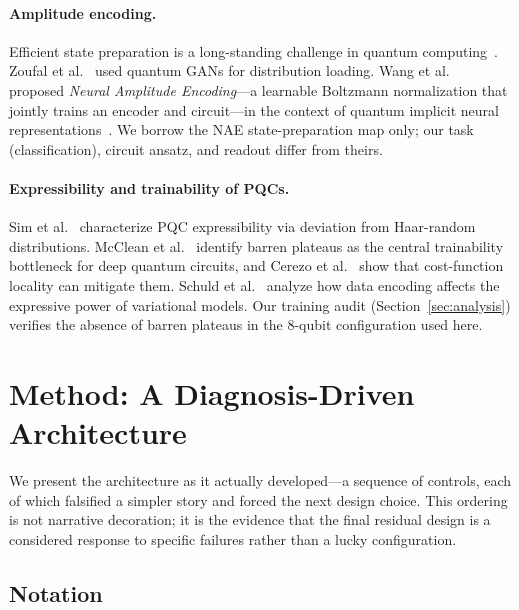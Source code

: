 \documentclass[10pt,letterpaper]{article}
\theoremstyle{plain}
\theoremstyle{definition}
\begin{document}
\paragraph{Amplitude encoding.}
Efficient state preparation is a long-standing challenge in quantum
computing~\cite{mottonen2005transformation,grover2002creating}.
Zoufal et al.~\cite{zoufal2019qgan} used quantum GANs for distribution loading.
Wang et al.~\cite{wang2025} proposed \emph{Neural Amplitude Encoding}---a
learnable Boltzmann normalization that jointly trains an encoder and circuit---in
the context of quantum implicit neural representations~\cite{zhao2024quantum}.
We borrow the NAE state-preparation map only; our task (classification), circuit
ansatz, and readout differ from theirs.

\paragraph{Expressibility and trainability of PQCs.}
Sim et al.~\cite{sim2019expressibility} characterize PQC expressibility via
deviation from Haar-random distributions.
McClean et al.~\cite{mcclean2018barren} identify barren plateaus as the central
trainability bottleneck for deep quantum circuits, and
Cerezo et al.~\cite{cerezo2021cost} show that cost-function locality can mitigate
them. Schuld et al.~\cite{schuld2021effect} analyze how data encoding affects the
expressive power of variational models. Our training audit
(Section~\ref{sec:analysis}) verifies the absence of barren plateaus in the
8-qubit configuration used here.

\section{Method: A Diagnosis-Driven Architecture}
\label{sec:method}

We present the architecture as it actually developed---a sequence of
controls, each of which falsified a simpler story and forced the next design
choice. This ordering is not narrative decoration; it is the evidence that the
final residual design is a considered response to specific failures rather than a
lucky configuration.

\subsection{Notation}
\label{sec:notation}
\end{document}
